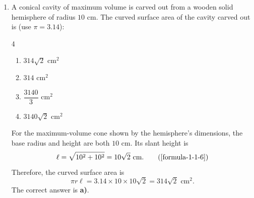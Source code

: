 \vspace{1.2em}
\begin{enumerate}[label={},font=\normalfont,leftmargin=1.15cm,labelwidth=1.0cm,labelsep=0.15cm,itemindent=0pt,listparindent=0pt,parsep=0pt,topsep=0pt]
\item[5.1.7] A conical cavity of maximum volume is carved out from a wooden solid hemisphere of radius $10$ cm. The curved surface area of the cavity carved out is (use $\pi=3.14$):

\begin{multicols}{4}
\begin{enumerate}
\setlength{\itemsep}{0pt}
    \item $314\sqrt{2}\text{ cm}^2$
    \item $314\text{ cm}^2$
    \item $\dfrac{3140}{3}\text{ cm}^2$
    \item $3140\sqrt{2}\text{ cm}^2$
\end{enumerate}
\end{multicols}

\vspace{0.7em}\par\solution


For the maximum-volume cone shown by the hemisphere's dimensions, the base radius and height are both $10$ cm. Its slant height is
\begin{equation*}
\ell=\sqrt{10^2+10^2}=10\sqrt{2}\text{ cm}.
\tag*{(\ref{formula-1-1-6})}\end{equation*}
Therefore, the curved surface area is
\[
\pi r\ell=3.14\times 10\times 10\sqrt{2}=314\sqrt{2}\text{ cm}^2.
\]
The correct answer is \textbf{a)}.

\end{enumerate}
\vspace{1.2em}
